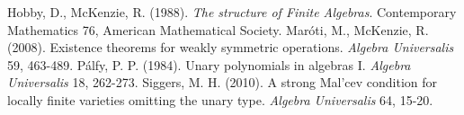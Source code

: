 \documentclass{amsart}
\theoremstyle{plain}
\theoremstyle{definition}
\theoremstyle{remark}
\begin{document}
\begin{thebibliography}{9}
    Hobby, D., McKenzie, R. (1988). \emph{The structure of Finite Algebras}. Contemporary Mathematics 76, American Mathematical Society.  
    Mar\'oti, M., McKenzie, R. (2008). Existence theorems for weakly symmetric operations. \emph{Algebra Universalis} 59, 463-489.
    P\'alfy, P. P. (1984). Unary polynomials in algebras I. \emph{Algebra Universalis} 18, 262-273.
    Siggers, M. H. (2010). A strong Mal'cev condition for locally finite varieties omitting the unary type. \emph{Algebra Universalis} 64, 15-20.
 \end{thebibliography}
\end{document}
